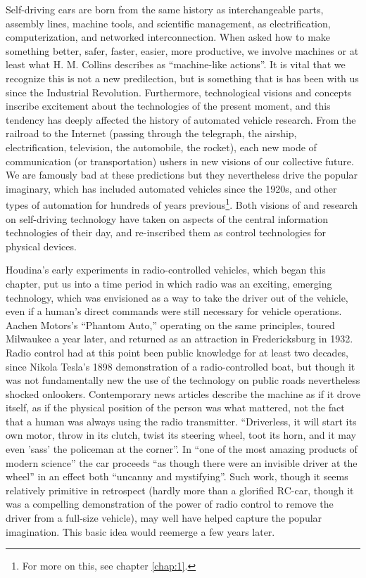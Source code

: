  Self-driving cars are born from the
same history as interchangeable parts, assembly lines, machine tools,
and scientific management, as electrification, computerization, and
networked interconnection. When asked how to make something better,
safer, faster, easier, more productive, we involve machines or at
least what H. M. Collins describes as ``machine-like actions''\cite{???}. It is
vital that we recognize this is not a new predilection, but is
something that is has been with us since the Industrial Revolution.
Furthermore, technological visions and concepts inscribe excitement about the
technologies of the present moment, and this tendency has deeply
affected the history of automated vehicle research. From the railroad to the
Internet (passing through the telegraph, the airship, electrification,
television, the automobile, the rocket), each new mode of
communication (or transportation\cite{???}) ushers in new visions of our
collective future. We are famously bad at these predictions\cite{???} but they
nevertheless drive the popular imaginary, which has included automated
vehicles since the 1920s, and other types of automation for hundreds
of years previous\footnote{For more on this, see chapter
  \ref{chap:1}.}. Both visions of and research on self-driving
technology have taken on aspects of the central information
technologies of their day, and re-inscribed them as control
technologies for physical devices.

Houdina's early experiments in radio-controlled vehicles, which began
this chapter, put us into a time period in which radio was an
exciting, emerging technology, which was envisioned as a way to take
the driver out of the vehicle, even if a human's direct commands were
still necessary for vehicle operations. Aachen Motors's ``Phantom
Auto,'' operating on the same principles, toured Milwaukee a year
later,\cite{???} and returned as an attraction in Fredericksburg in 1932\cite{???}.
Radio control had at this point been public knowledge for at least two
decades, since Nikola Tesla's 1898 demonstration of a radio-controlled
boat,\cite{???} but though it was not fundamentally new the use of the
technology on public roads nevertheless shocked onlookers.
Contemporary news articles describe the machine as if it drove itself,
as if the physical position of the person was what mattered, not the
fact that a human was always using the radio transmitter. ``Driverless,
it will start its own motor, throw in its clutch, twist its steering
wheel, toot its horn, and it may even 'sass' the policeman at the
corner''\cite{???}. In ``one of the most amazing products of modern science'' the
car proceeds ``as though there were an invisible driver at the wheel''
in an effect both ``uncanny and mystifying''\cite{???}. Such work,
though it seems relatively primitive in retrospect (hardly more than a
glorified RC-car, though it was a compelling demonstration of the
power of radio control to remove the driver from a full-size vehicle), may well have
helped capture the popular imagination. This basic idea would reemerge
a few years later.

